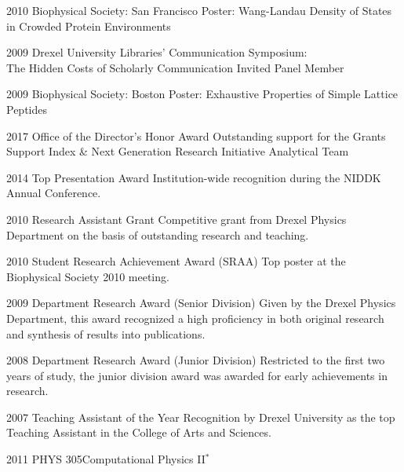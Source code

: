 \documentclass[]{scrartcl}
\begin{document}
\begin{cleanCV}
\WorkExperienceX
{2010}
{Biophysical Society: San Francisco}
{Poster: Wang-Landau Density of States in Crowded Protein Environments}

\WorkExperienceX
{2009}
{Drexel University Libraries' Communication Symposium:\\The Hidden Costs of Scholarly Communication}
{Invited Panel Member}

\WorkExperienceX
{2009}
{Biophysical Society: Boston}
{Poster: Exhaustive Properties of Simple Lattice Peptides}



\WorkExperienceX
{2017}
{Office of the Director's Honor Award}
{Outstanding support for the Grants Support Index \& Next Generation Research Initiative Analytical Team}

\WorkExperienceX
{2014}
{Top Presentation Award}
{Institution-wide recognition during the NIDDK Annual Conference.}

\WorkExperienceX
{2010}
{Research Assistant Grant}
{Competitive grant from Drexel Physics Department on the basis of outstanding research and teaching.}

\WorkExperienceX
{2010}
{Student Research Achievement Award (SRAA)}
{Top poster at the Biophysical Society 2010 meeting. }

\WorkExperienceX
{2009}
{Department Research Award (Senior Division)}
{Given by the Drexel Physics Department, this award recognized a high proficiency in both original research and synthesis of results into publications.}

\WorkExperienceX
{2008}
{Department Research Award (Junior Division)}
{Restricted to the first two years of study, the junior division award was awarded for early achievements in research.}

\WorkExperienceX
{2007}
{Teaching Assistant of the Year} {}
{Recognition by Drexel University as the top Teaching Assistant in the College of Arts and Sciences.}


\newpage


\newcommand{\TeachingNote}{$^*$}

\Teaching
{2011}
{PHYS 305}{Computational Physics II\TeachingNote}


\end{cleanCV}
\end{document}
